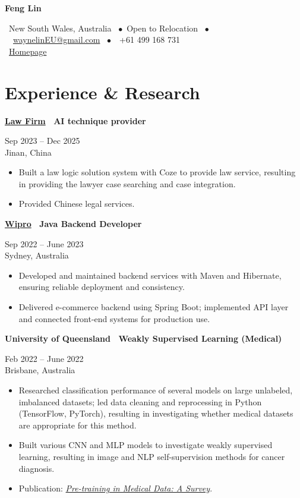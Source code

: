 \documentclass[10pt,a4paper]{article}
\newcommand{\name}[1]{\begin{center}\Huge\bfseries\color{accent} #1\end{center}\vspace{-0.15cm}}
\newcommand{\contactline}[2]{\begin{center}\small #1 \\[0.25em] #2\end{center}\vspace{0.28cm}}
\newcommand{\itembullet}{\ $\bullet$\ }
\newcommand{\dateright}[2]{\hfill \parbox[t]{4.5cm}{\raggedleft\small #1 \\ \small #2}}
\newcommand{\entry}[3]{\noindent #1 \dateright{#2}{#3}\vspace{1pt}}
\begin{document}
\name{Feng Lin}
\contactline{
  \faMapMarker*\ New South Wales, Australia \itembullet Open to Relocation
  \itembullet \faEnvelope\ \href{mailto:waynelinEU@gmail.com}{waynelinEU@gmail.com}
  \itembullet \faPhone\ +61 499 168 731
}{
  \faGlobe\ \href{https://homepage-jade-two.vercel.app}{Homepage}
}
\vspace{-0.12cm}

\section*{Experience \& Research}

\entry{\textbf{\href{https://www.jtn.com/CN/index.aspx}{Law Firm} \textbar\ AI technique provider}}{Sep 2023 -- Dec 2025}{Jinan, China}
\begin{itemize}[leftmargin=1.5em, nosep, topsep=1pt]
  \item Built a law logic solution system with Coze to provide law service, resulting in providing the lawyer case searching and case integration.
  \item Provided Chinese legal services.
\end{itemize}
\vspace{0.12cm}

\entry{\textbf{\href{https://www.wipro.com/en-ANZ}{Wipro} \textbar\ Java Backend Developer}}{Sep 2022 -- June 2023}{Sydney, Australia}
\begin{itemize}[leftmargin=1.5em, nosep, topsep=1pt]
  \item Developed and maintained backend services with Maven and Hibernate, ensuring reliable deployment and consistency.
  \item Delivered e-commerce backend using Spring Boot; implemented API layer and connected front-end systems for production use.
\end{itemize}
\vspace{0.12cm}

\entry{\textbf{University of Queensland \textbar\ Weakly Supervised Learning (Medical)}}{Feb 2022 -- June 2022}{Brisbane, Australia}
\begin{itemize}[leftmargin=1.5em, nosep, topsep=1pt]
  \item Researched classification performance of several models on large unlabeled, imbalanced datasets; led data cleaning and reprocessing in Python (TensorFlow, PyTorch), resulting in investigating whether medical datasets are appropriate for this method.
  \item Built various CNN and MLP models to investigate weakly supervised learning, resulting in image and NLP self-supervision methods for cancer diagnosis.
  \item Publication: \href{https://link.springer.com/article/10.1007/s11633-022-1382-8}{\textit{Pre-training in Medical Data: A Survey}}.
\end{itemize}
\vspace{0.12cm}
\end{document}
